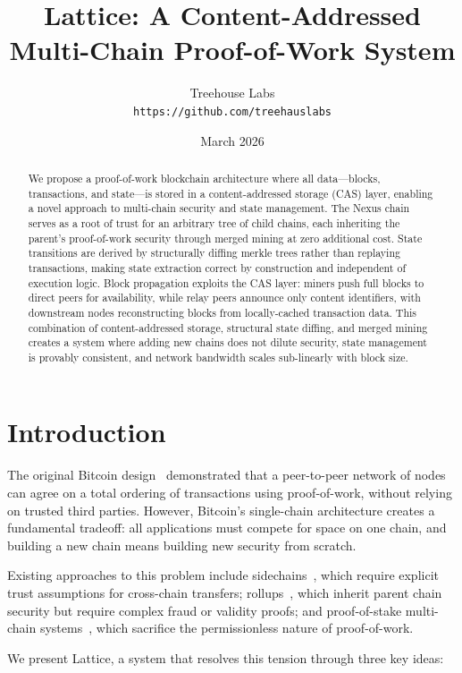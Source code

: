 \documentclass[11pt,a4paper]{article}
\title{\vspace{-2cm}\textbf{Lattice: A Content-Addressed\\Multi-Chain Proof-of-Work System}}
\author{Treehouse Labs\\\texttt{https://github.com/treehauslabs}}
\date{March 2026}
\begin{document}
\maketitle
\thispagestyle{fancy}

\begin{abstract}
We propose a proof-of-work blockchain architecture where all data---blocks, transactions, and state---is stored in a content-addressed storage (CAS) layer, enabling a novel approach to multi-chain security and state management. The Nexus chain serves as a root of trust for an arbitrary tree of child chains, each inheriting the parent's proof-of-work security through merged mining at zero additional cost. State transitions are derived by structurally diffing merkle trees rather than replaying transactions, making state extraction correct by construction and independent of execution logic. Block propagation exploits the CAS layer: miners push full blocks to direct peers for availability, while relay peers announce only content identifiers, with downstream nodes reconstructing blocks from locally-cached transaction data. This combination of content-addressed storage, structural state diffing, and merged mining creates a system where adding new chains does not dilute security, state management is provably consistent, and network bandwidth scales sub-linearly with block size.
\end{abstract}

\section{Introduction}

The original Bitcoin design~\cite{nakamoto2008} demonstrated that a peer-to-peer network of nodes can agree on a total ordering of transactions using proof-of-work, without relying on trusted third parties. However, Bitcoin's single-chain architecture creates a fundamental tradeoff: all applications must compete for space on one chain, and building a new chain means building new security from scratch.

Existing approaches to this problem include sidechains~\cite{back2014}, which require explicit trust assumptions for cross-chain transfers; rollups~\cite{buterin2021rollups}, which inherit parent chain security but require complex fraud or validity proofs; and proof-of-stake multi-chain systems~\cite{buchman2018}, which sacrifice the permissionless nature of proof-of-work.

We present Lattice, a system that resolves this tension through three key ideas:
\end{document}
